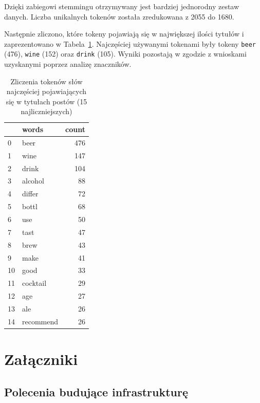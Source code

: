 \documentclass[
  letterpaper,
  DIV=11,
  numbers=noendperiod]{scrreprt}
\begin{document}
Dzięki zabiegowi stemmingu otrzymywany jest bardziej jednorodny zestaw
danych. Liczba unikalnych tokenów została zredukowana z 2055 do 1680.

Następnie zliczono, które tokeny pojawiają się w największej ilości
tytułów i zaprezentowano w Tabela~\ref{tbl-tokens_count}. Najczęściej
używanymi tokenami były tokeny \texttt{beer} (476), \texttt{wine} (152)
oraz \texttt{drink} (105). Wyniki pozostają w zgodzie z wnioskami
uzyskanymi poprzez analizę znaczników.

\hypertarget{tbl-tokens_count}{}
\begin{table}
\caption{\label{tbl-tokens_count}Zliczenia tokenów słów najczęściej pojawiających się w tytułach postów
(15 najliczniejszych) }\tabularnewline

\centering
\begin{tabular}{llr}
\toprule
{} &      words &  count \\
\midrule
0  &       beer &    476 \\
1  &       wine &    147 \\
2  &      drink &    104 \\
3  &    alcohol &     88 \\
4  &     differ &     72 \\
5  &      bottl &     68 \\
6  &        use &     50 \\
7  &       tast &     47 \\
8  &       brew &     43 \\
9  &       make &     41 \\
10 &       good &     33 \\
11 &   cocktail &     29 \\
12 &        age &     27 \\
13 &        ale &     26 \\
14 &  recommend &     26 \\
\bottomrule
\end{tabular}
\end{table}


\hypertarget{sec-appendix}{%
\chapter{Załączniki}\label{sec-appendix}}

\hypertarget{polecenia-budujux105ce-infrastrukturux119}{%
\section{Polecenia budujące
infrastrukturę}\label{polecenia-budujux105ce-infrastrukturux119}}
\end{document}
